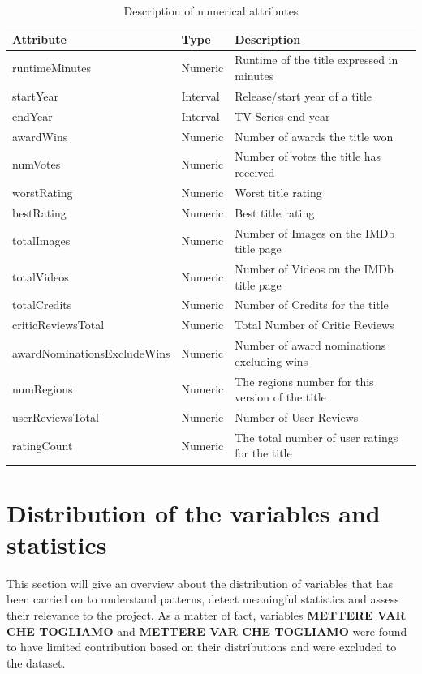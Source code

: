 \begin{table}[h]
    \centering
    \begin{tabular}{|l|l|l|} %
        \hline
        \textbf{Attribute} & \textbf{Type} & \textbf{Description} \\ 
        \hline
        runtimeMinutes & Numeric & Runtime of the title expressed in minutes \\ 
        \hline
        startYear & Interval & Release/start year of a title \\ 
        \hline
        endYear & Interval & TV Series end year \\
        \hline
        awardWins & Numeric & Number of awards the title won \\ 
        \hline
        numVotes & Numeric & Number of votes the title has received \\ 
        \hline
        worstRating & Numeric & Worst title rating \\ 
        \hline
        bestRating & Numeric & Best title rating \\ 
        \hline
        totalImages & Numeric & Number of Images on the IMDb title page \\ 
        \hline
        totalVideos & Numeric & Number of Videos on the IMDb title page \\ 
        \hline
        totalCredits & Numeric & Number of Credits for the title \\ 
        \hline
        criticReviewsTotal & Numeric & Total Number of Critic Reviews \\ 
        \hline
        awardNominationsExcludeWins & Numeric & Number of award nominations excluding wins \\ 
        \hline
        numRegions & Numeric & The regions number for this version of the title \\ 
        \hline
        userReviewsTotal & Numeric & Number of User Reviews \\ 
        \hline
        ratingCount & Numeric & The total number of user ratings for the title \\ 
        \hline
    \end{tabular}
    \caption{Description of numerical attributes}
    \label{tab:numerical_attributes}
\end{table}
\section{Distribution of the variables and statistics}\label{sec:variable_distrib}
This section will give an overview about the distribution of variables that has been carried on to understand patterns, detect meaningful statistics and assess their relevance to the project. 
As a matter of fact, variables \textbf{METTERE VAR CHE TOGLIAMO} and \textbf{METTERE VAR CHE TOGLIAMO} were found to have limited contribution based on their distributions and were excluded to the dataset.

